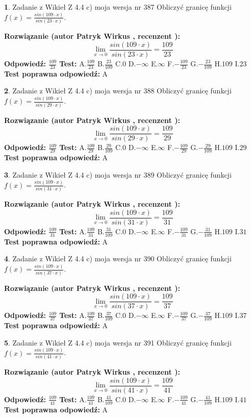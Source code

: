 \documentclass[12pt, a4paper]{article}
\theoremstyle{definition} %
\newtheorem{zad}{}
\newcommand{\zadStart}[1]{\begin{zad}#1\newline}
\newcommand{\zadStop}{\end{zad}}
\newcommand{\rozwStart}[2]{\noindent \textbf{Rozwiązanie (autor #1 , recenzent #2): }\newline}
\newcommand{\rozwStop}{\newline}
\newcommand{\odpStart}{\noindent \textbf{Odpowiedź:}\newline}
\newcommand{\odpStop}{\newline}
\newcommand{\testStart}{\noindent \textbf{Test:}\newline}
\newcommand{\testStop}{\newline}
\newcommand{\kluczStart}{\noindent \textbf{Test poprawna odpowiedź:}\newline}
\newcommand{\kluczStop}{\newline}
\begin{document}
\zadStart{Zadanie z Wikieł Z 4.4 c) moja wersja nr 387}
Obliczyć granicę funkcji $f(x)=\frac{sin(109\cdot x)}{sin(23\cdot x)}$.
\zadStop
\rozwStart{Patryk Wirkus}{}
$$\lim\limits_{x\to 0}\frac{sin(109\cdot x)}{sin(23\cdot x)}=
\frac{109}{23}$$
\rozwStop
\odpStart
$\frac{109}{23}$
\odpStop
\testStart
A.$\frac{109}{23}$
B.$\frac{23}{109}$
C.$0$
D.$-\infty$
E.$\infty$
F.$-\frac{109}{23}$
G.$-\frac{23}{109}$
H.$109$
I.$23$
\testStop
\kluczStart
A
\kluczStop



\zadStart{Zadanie z Wikieł Z 4.4 c) moja wersja nr 388}
Obliczyć granicę funkcji $f(x)=\frac{sin(109\cdot x)}{sin(29\cdot x)}$.
\zadStop
\rozwStart{Patryk Wirkus}{}
$$\lim\limits_{x\to 0}\frac{sin(109\cdot x)}{sin(29\cdot x)}=
\frac{109}{29}$$
\rozwStop
\odpStart
$\frac{109}{29}$
\odpStop
\testStart
A.$\frac{109}{29}$
B.$\frac{29}{109}$
C.$0$
D.$-\infty$
E.$\infty$
F.$-\frac{109}{29}$
G.$-\frac{29}{109}$
H.$109$
I.$29$
\testStop
\kluczStart
A
\kluczStop



\zadStart{Zadanie z Wikieł Z 4.4 c) moja wersja nr 389}
Obliczyć granicę funkcji $f(x)=\frac{sin(109\cdot x)}{sin(31\cdot x)}$.
\zadStop
\rozwStart{Patryk Wirkus}{}
$$\lim\limits_{x\to 0}\frac{sin(109\cdot x)}{sin(31\cdot x)}=
\frac{109}{31}$$
\rozwStop
\odpStart
$\frac{109}{31}$
\odpStop
\testStart
A.$\frac{109}{31}$
B.$\frac{31}{109}$
C.$0$
D.$-\infty$
E.$\infty$
F.$-\frac{109}{31}$
G.$-\frac{31}{109}$
H.$109$
I.$31$
\testStop
\kluczStart
A
\kluczStop



\zadStart{Zadanie z Wikieł Z 4.4 c) moja wersja nr 390}
Obliczyć granicę funkcji $f(x)=\frac{sin(109\cdot x)}{sin(37\cdot x)}$.
\zadStop
\rozwStart{Patryk Wirkus}{}
$$\lim\limits_{x\to 0}\frac{sin(109\cdot x)}{sin(37\cdot x)}=
\frac{109}{37}$$
\rozwStop
\odpStart
$\frac{109}{37}$
\odpStop
\testStart
A.$\frac{109}{37}$
B.$\frac{37}{109}$
C.$0$
D.$-\infty$
E.$\infty$
F.$-\frac{109}{37}$
G.$-\frac{37}{109}$
H.$109$
I.$37$
\testStop
\kluczStart
A
\kluczStop



\zadStart{Zadanie z Wikieł Z 4.4 c) moja wersja nr 391}
Obliczyć granicę funkcji $f(x)=\frac{sin(109\cdot x)}{sin(41\cdot x)}$.
\zadStop
\rozwStart{Patryk Wirkus}{}
$$\lim\limits_{x\to 0}\frac{sin(109\cdot x)}{sin(41\cdot x)}=
\frac{109}{41}$$
\rozwStop
\odpStart
$\frac{109}{41}$
\odpStop
\testStart
A.$\frac{109}{41}$
B.$\frac{41}{109}$
C.$0$
D.$-\infty$
E.$\infty$
F.$-\frac{109}{41}$
G.$-\frac{41}{109}$
H.$109$
I.$41$
\testStop
\kluczStart
A
\kluczStop
\end{document}
